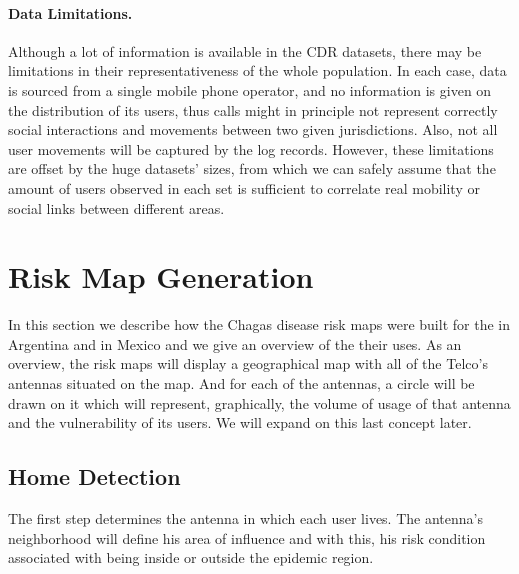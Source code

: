 \paragraph{Data Limitations.}
Although a lot of information is available in the CDR datasets, there may be limitations in their representativeness of the whole population. In each case, data is sourced from a single mobile phone operator, and no information is given on the distribution of its users, thus calls might in principle not represent correctly social interactions and movements between two given jurisdictions. Also, not all user movements will be captured by the log records. However, these limitations are offset by the huge datasets' sizes, from which we can safely assume that the amount of users observed in each set is sufficient to correlate real mobility or social links between different areas.






\section{ Risk Map Generation} \label{methods}

In this section we describe how the Chagas disease risk maps were built for the in Argentina and in Mexico and we give an overview of the their uses. As an overview, the risk maps will display a geographical map with all of the Telco's antennas situated on the map. And for each of the antennas, a circle will be drawn on it which will represent, graphically, the volume of usage of that antenna and the vulnerability of its users. We will expand on this last concept later.

\subsection{Home Detection}

The first step determines the antenna in which each user lives. The antenna's neighborhood will define his area of influence and with this, his risk condition associated with being inside or outside the epidemic region.


